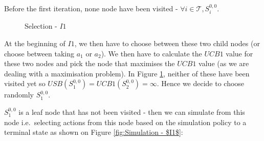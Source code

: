 Before the first iteration, none node have been visited - $\forall i \in \mathcal{T}, S^{0,0}_{i}$.
\begin{figure}[!ht]
    \centering
    \caption{Selection - $I1$}
    \label{fig:Expansion of the tree from the root node}
\end{figure}
At the beginning of $I1$, we then have to choose between these two child nodes (or choose between taking $a_1$ or $a_2$). We then have to calculate the $UCB1$ value for these two nodes and pick the node that maximises the $UCB1$ value (as we are dealing with a maximisation problem).
In Figure \ref{fig:Expansion of the tree from the root node}, neither of these have been visited yet so $USB(S^{0,0}_1)=UCB1(S^{0,0}_2)=\infty$. Hence we decide to choose randomly $S^{0,0}_1$.

$S^{0,0}_1$ is a leaf node that has not been visited - then we can simulate from this node i.e.\ selecting actions from this node based on the simulation policy to a terminal state as shown on Figure \ref{fig:Simulation - $I1$}:

